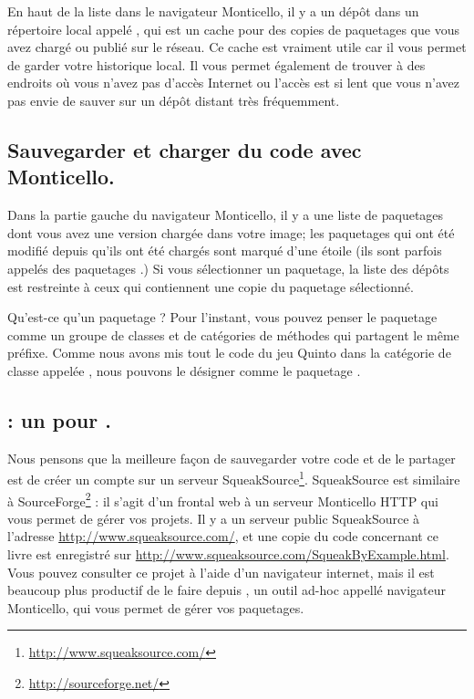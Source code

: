 \documentclass[a4paper,10pt,twoside]{book}
\begin{document}
En haut de la liste dans le navigateur Monticello, il y a un dépôt dans un répertoire local appelé , qui est un cache pour des copies de paquetages que vous avez chargé ou publié sur le réseau. Ce cache est vraiment utile car il vous permet de garder votre historique local. Il vous permet également de trouver à des endroits où vous n'avez pas d'accès Internet ou l'accès est si lent que vous n'avez pas envie de sauver sur un dépôt distant très fréquemment.

\subsection{Sauvegarder et charger du code avec Monticello.}
Dans la partie gauche du navigateur Monticello, il y a une liste de paquetages dont vous avez une version chargée dans votre image; les paquetages qui ont été modifié depuis qu'ils ont été chargés sont marqué d'une étoile (ils sont parfois appelés des paquetages .) Si vous sélectionner un paquetage, la liste des dépôts est restreinte à ceux qui contiennent une copie du paquetage sélectionné.

Qu'est-ce qu'un paquetage ? Pour l'instant, vous pouvez penser le paquetage comme un groupe de classes et de catégories de méthodes qui partagent le même préfixe. Comme nous avons mis tout le code du jeu Quinto dans la catégorie de classe appelée , nous pouvons le désigner comme le paquetage .


\subsection{: un  pour \squeak.} 
Nous pensons que la meilleure façon de sauvegarder votre code et de le partager est de créer un compte sur un serveur SqueakSource\footnote{\url{http://www.squeaksource.com/}}.
SqueakSource est similaire à SourceForge\footnote{\url{http://sourceforge.net/}} : il s'agit d'un frontal web à un serveur Monticello HTTP qui vous permet de gérer vos projets.
Il y a un serveur public SqueakSource à l'adresse \url{http://www.squeaksource.com/}, et une copie du code concernant ce livre est enregistré sur \url{http://www.squeaksource.com/SqueakByExample.html}. Vous pouvez consulter ce projet à l'aide d'un navigateur internet, mais il est beaucoup plus productif de le faire depuis \squeak, un outil ad-hoc appellé navigateur Monticello, qui vous permet de gérer vos paquetages.
\end{document}
